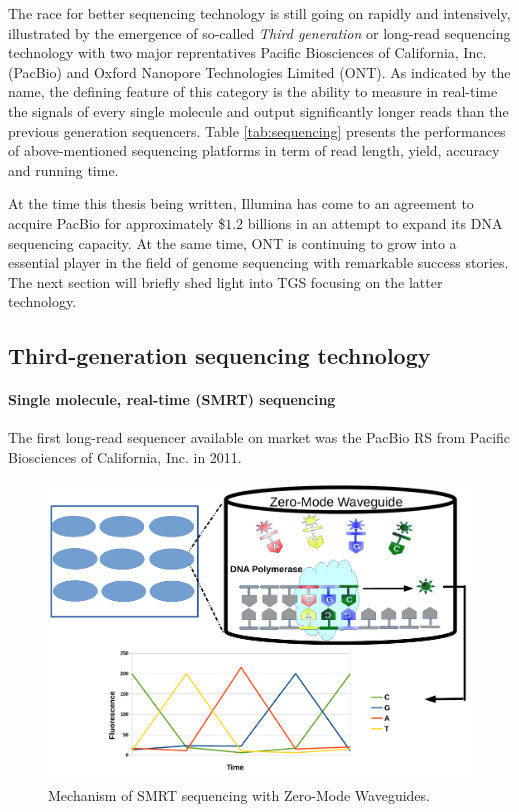 The race for better sequencing technology is still going on rapidly and intensively, illustrated by the emergence of so-called \emph{Third generation} or long-read sequencing technology \cite{Munroe2010third,Bleidorn2016third} with two major reprentatives \IE{} Pacific Biosciences of California, Inc. (PacBio) and Oxford Nanopore Technologies Limited (ONT). 
As indicated by the name, the defining feature of this category is the ability to measure in real-time the signals of every single molecule and output significantly longer reads than the previous generation sequencers. 
Table \ref{tab:sequencing} presents the performances of above-mentioned sequencing platforms in term of read length, yield, accuracy and running time.

At the time this thesis being written, Illumina has come to an agreement to acquire PacBio for approximately \$$1.2$ billions in an attempt to expand its DNA sequencing capacity. At the same time,  ONT is continuing to grow into a essential player in the field of genome sequencing with remarkable success stories.
The next section will briefly shed light into TGS focusing on the latter technology.

\subsection{Third-generation sequencing technology}
\paragraph{Single molecule, real-time (SMRT) sequencing}
The first long-read sequencer available on market was the PacBio RS from Pacific Biosciences of California, Inc. in 2011. 

\begin{figure}[ht!]
\centering
\includegraphics[width=.8\textwidth]{images/pacbio.pdf}
\caption{Mechanism of SMRT sequencing with Zero-Mode Waveguides.}
\label{F:pacbio}
\end{figure}

